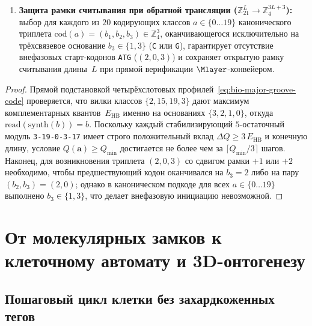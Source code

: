 \begin{theorem}
\begin{enumerate}[leftmargin=*]
\item \textbf{Защита рамки считывания при обратной трансляции ($\mathbb{Z}_{21}^L \to \mathbb{Z}_4^{3L+3}$):}
  выбор для каждого из $20$ кодирующих классов $a\in\{0\ldots 19\}$ канонического триплета $\mathrm{cod}(a) = (b_1, b_2, b_3)\in\mathbb{Z}_4^3$, оканчивающегося исключительно на трёхсвязевое основание $b_3 \in \{1, 3\}$ (\texttt{C} или \texttt{G}), гарантирует отсутствие внефазовых старт-кодонов \texttt{ATG} ($(2,0,3)$) и сохраняет открытую рамку считывания длины~$L$ при прямой верификации $\Mlayer$-конвейером.
\end{enumerate}
\end{theorem}

\begin{proof}
Прямой подстановкой четырёхслотовых профилей~\eqref{eq:bio-major-groove-code} проверяется, что вилки классов $\{2, 15, 19, 3\}$ дают максимум комплементарных квантов~$E_{\mathrm{HB}}$ именно на основаниях $\{3, 2, 1, 0\}$, откуда $\mathrm{read}(\mathrm{synth}(b)) = b$.
Поскольку каждый стабилизирующий $5$-остаточный модуль \texttt{3-19-0-3-17} имеет строго положительный вклад $\Delta Q \ge 3\,E_{\mathrm{HB}}$ и конечную длину, условие $Q(\mathbf{a}) \ge Q_{\mathrm{min}}$ достигается не более чем за $\lceil Q_{\mathrm{min}}/3\rceil$ шагов.
Наконец, для возникновения триплета $(2, 0, 3)$ со сдвигом рамки $+1$ или $+2$ необходимо, чтобы предшествующий кодон оканчивался на $b_3 = 2$ либо на пару $(b_2, b_3) = (2, 0)$; однако в каноническом подкоде для всех $a\in\{0\ldots 19\}$ выполнено $b_3\in\{1, 3\}$, что делает внефазовую инициацию невозможной.
\end{proof}

\chapter{От молекулярных замков к клеточному автомату и 3D-онтогенезу}
\label{ch:bio-ontogeny-ca}

\section{Пошаговый цикл клетки без захардкоженных тегов}
\label{sec:bio-cell-cycle-o1}


